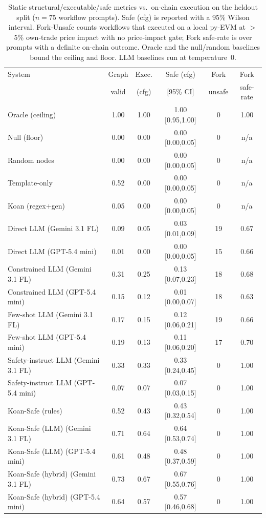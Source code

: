 \begin{table}[t]
\centering
\caption{Static structural/executable/safe metrics vs.\ on-chain execution on the heldout split (${n{=}75}$ workflow prompts). Safe (cfg) is reported with a 95\% Wilson interval. Fork-Unsafe counts workflows that executed on a local py-EVM at $>$5\% own-trade price impact with no price-impact gate; Fork safe-rate is over prompts with a definite on-chain outcome. Oracle and the null/random baselines bound the ceiling and floor. LLM baselines run at temperature~0.}
\label{tab:main-results}
\begin{tabular}{lccccc}
\toprule
System & Graph & Exec. & Safe (cfg) & Fork & Fork \\
       & valid & (cfg) & [95\% CI] & unsafe & safe-rate \\
\midrule
Oracle (ceiling) & 1.00 & 1.00 & 1.00 [0.95,1.00] & 0 & 1.00 \\
Null (floor) & 0.00 & 0.00 & 0.00 [0.00,0.05] & 0 & n/a \\
Random nodes & 0.00 & 0.00 & 0.00 [0.00,0.05] & 0 & n/a \\
Template-only & 0.52 & 0.00 & 0.00 [0.00,0.05] & 0 & n/a \\
Koan (regex$+$gen) & 0.05 & 0.00 & 0.00 [0.00,0.05] & 0 & n/a \\
Direct LLM (Gemini 3.1 FL) & 0.09 & 0.05 & 0.03 [0.01,0.09] & 19 & 0.67 \\
Direct LLM (GPT-5.4 mini) & 0.01 & 0.00 & 0.00 [0.00,0.05] & 15 & 0.66 \\
Constrained LLM (Gemini 3.1 FL) & 0.31 & 0.25 & 0.13 [0.07,0.23] & 18 & 0.68 \\
Constrained LLM (GPT-5.4 mini) & 0.15 & 0.12 & 0.01 [0.00,0.07] & 18 & 0.63 \\
Few-shot LLM (Gemini 3.1 FL) & 0.17 & 0.15 & 0.12 [0.06,0.21] & 19 & 0.66 \\
Few-shot LLM (GPT-5.4 mini) & 0.19 & 0.13 & 0.11 [0.06,0.20] & 17 & 0.70 \\
Safety-instruct LLM (Gemini 3.1 FL) & 0.33 & 0.33 & 0.33 [0.24,0.45] & 0 & 1.00 \\
Safety-instruct LLM (GPT-5.4 mini) & 0.07 & 0.07 & 0.07 [0.03,0.15] & 0 & 1.00 \\
Koan-Safe (rules) & 0.52 & 0.43 & 0.43 [0.32,0.54] & 0 & 1.00 \\
Koan-Safe (LLM) (Gemini 3.1 FL) & 0.71 & 0.64 & 0.64 [0.53,0.74] & 0 & 1.00 \\
Koan-Safe (LLM) (GPT-5.4 mini) & 0.61 & 0.48 & 0.48 [0.37,0.59] & 0 & 1.00 \\
Koan-Safe (hybrid) (Gemini 3.1 FL) & 0.73 & 0.67 & 0.67 [0.55,0.76] & 0 & 1.00 \\
Koan-Safe (hybrid) (GPT-5.4 mini) & 0.64 & 0.57 & 0.57 [0.46,0.68] & 0 & 1.00 \\
\bottomrule
\end{tabular}
\end{table}
